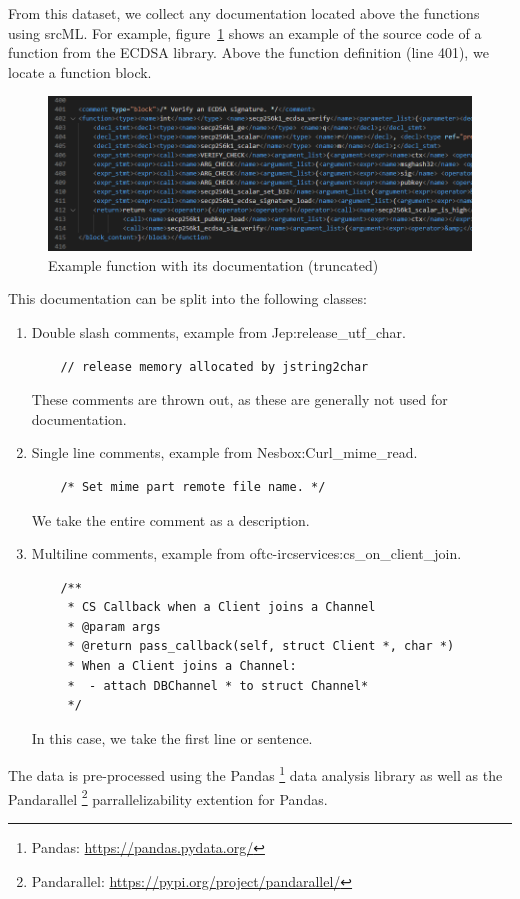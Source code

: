 From this dataset, we collect any documentation located above the functions using srcML. For example, figure~\ref {fig:srcML} shows an example of the source code of a function from the ECDSA library. Above the function definition (line 401), we locate a function block. 

\begin{figure}[tbh]
  \centering
  \includegraphics[width=\linewidth]{img/srcML.png}
  \caption{Example function with its documentation (truncated)}
  \label{fig:srcML}
\end{figure}

This documentation can be split into the following classes: 
\begin{enumerate}
  \item Double slash comments, example from Jep:release\_utf\_char. 
\begin{verbatim}
    // release memory allocated by jstring2char
\end{verbatim}
    These comments are thrown out, as these are generally not used for documentation.
  \item Single line comments, example from Nesbox:Curl\_mime\_read.
\begin{verbatim}
    /* Set mime part remote file name. */
\end{verbatim}
   We take the entire comment as a description.
  \item Multiline comments, example from oftc-ircservices:cs\_on\_client\_join.
\begin{verbatim}
    /**
     * CS Callback when a Client joins a Channel
     * @param args 
     * @return pass_callback(self, struct Client *, char *)
     * When a Client joins a Channel:
     *  - attach DBChannel * to struct Channel*
     */
\end{verbatim}
    In this case, we take the first line or sentence.
\end{enumerate}



The data is pre-processed using the Pandas \footnote{Pandas: \url{https://pandas.pydata.org/}} data analysis library as well as the Pandarallel \footnote{Pandarallel: \url{https://pypi.org/project/pandarallel/}} parrallelizability extention for Pandas.


